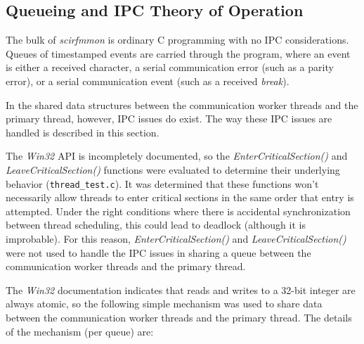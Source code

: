 \documentclass[letterpaper,10pt,titlepage]{article}
\newcommand{\productname}{scirfmmon}
\newcommand{\productnameemph}{\emph{\productname}}
\begin{document}
\subsection{Queueing and IPC Theory of Operation} 
\label{sswd0:sqip0}

The bulk of \productnameemph{} is ordinary C programming with no IPC
considerations.  Queues of timestamped events are carried through the program, where
an event is either a received character, a serial communication error (such
as a parity error), or a serial communication event (such as a received
\emph{break}).

In the shared data structures between the communication worker threads
and the primary thread, however, IPC issues do exist.  The way these
IPC issues are handled is described in this section.

The \emph{Win32} API is incompletely documented, so the
\emph{EnterCriticalSection()} and \emph{LeaveCriticalSection()}
functions were evaluated to determine their underlying behavior
(\texttt{thread\_test.c}).
It was determined that these functions won't necessarily allow threads
to enter critical sections in the same order that entry is attempted.
Under the right conditions where there is accidental synchronization between thread
scheduling, this could lead to deadlock (although it is improbable)\@.
For this reason, \emph{EnterCriticalSection()} and \emph{LeaveCriticalSection()}
were not used to handle the IPC issues in sharing a queue between the
communication worker threads and the primary thread.

The \emph{Win32} documentation indicates that reads and writes to
a 32-bit integer are always atomic, so the following simple mechanism 
was used to share data between the communication worker threads and the
primary thread.  The details of the mechanism (per queue) are:
\end{document}
